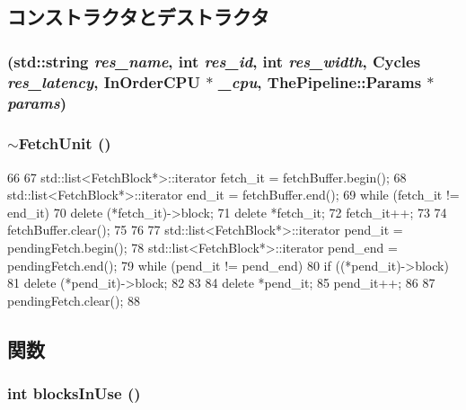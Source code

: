 \subsection{コンストラクタとデストラクタ}
\hypertarget{classFetchUnit_a75059c82e769a677cc5e29338234493b}{
\subsubsection[{FetchUnit}]{ (std::string {\em res\_\-name}, \/  int {\em res\_\-id}, \/  int {\em res\_\-width}, \/  {\bf Cycles} {\em res\_\-latency}, \/  {\bf InOrderCPU} $\ast$ {\em \_\-cpu}, \/  {\bf ThePipeline::Params} $\ast$ {\em params})}}
\label{classFetchUnit_a75059c82e769a677cc5e29338234493b}
\hypertarget{classFetchUnit_a1c06a50150220d7a3cf7acc6e3161c01}{
\subsubsection[{$\sim$FetchUnit}]{\setlength{\rightskip}{0pt plus 5cm}$\sim${\bf FetchUnit} ()}}
\label{classFetchUnit_a1c06a50150220d7a3cf7acc6e3161c01}



\begin{DoxyCode}
66 {
67     std::list<FetchBlock*>::iterator fetch_it = fetchBuffer.begin();
68     std::list<FetchBlock*>::iterator end_it = fetchBuffer.end();
69     while (fetch_it != end_it) {
70         delete (*fetch_it)->block;
71         delete *fetch_it;
72         fetch_it++;
73     }
74     fetchBuffer.clear();
75 
76 
77     std::list<FetchBlock*>::iterator pend_it = pendingFetch.begin();
78     std::list<FetchBlock*>::iterator pend_end = pendingFetch.end();
79     while (pend_it != pend_end) {
80         if ((*pend_it)->block) {
81             delete (*pend_it)->block;
82         }
83 
84         delete *pend_it;
85         pend_it++;
86     }
87     pendingFetch.clear();
88 }
\end{DoxyCode}


\subsection{関数}
\hypertarget{classFetchUnit_a09d558cb19e49cebfa44ecfad6ca98d7}{
\subsubsection[{blocksInUse}]{\setlength{\rightskip}{0pt plus 5cm}int blocksInUse ()}}
\label{classFetchUnit_a09d558cb19e49cebfa44ecfad6ca98d7}



